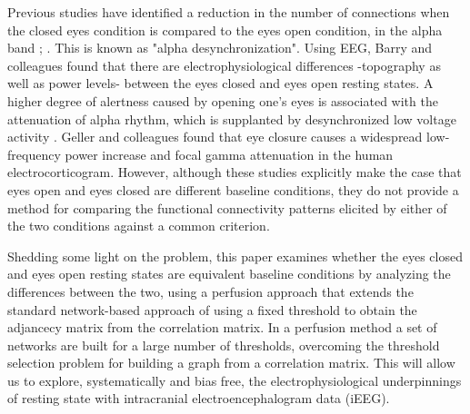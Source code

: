 \documentclass[11pt, onecolumn]{article}
\begin{document}
Previous studies have identified a reduction in the number of connections when the closed eyes condition is compared to the eyes open condition, in the alpha band \citep{tan2013difference}; \citep{barry2007eeg}. This is known as  "alpha desynchronization". Using EEG, Barry and colleagues \citep{barry2007eeg} found that there are electrophysiological differences -topography as well as power levels- between the eyes closed and eyes open resting states.  
A higher degree of alertness caused by opening one's eyes is associated with the attenuation of alpha rhythm, which is supplanted by desynchronized low voltage activity \citep{niedermeyer2005electroencephalography}.
Geller and colleagues \citep{geller2014eye} found that eye closure causes a widespread low-frequency power increase and focal gamma attenuation in the human electrocorticogram. 
However, although these studies explicitly make the case that eyes open and eyes closed are different baseline conditions, they do not provide a method for comparing the functional connectivity patterns elicited by either of the two conditions against a common criterion.

Shedding some light on the problem, this paper examines whether the eyes closed and eyes open resting states are equivalent baseline conditions by analyzing the differences between the two, using a perfusion approach that extends the standard network-based approach of using a fixed threshold to obtain the adjancecy matrix from the correlation matrix. In a perfusion method a set of networks are built for a large number of thresholds, overcoming the threshold selection problem for building a graph from a correlation matrix.
This will allow us to explore, systematically and bias free, the electrophysiological underpinnings of resting state with intracranial electroencephalogram data (iEEG).
\end{document}
